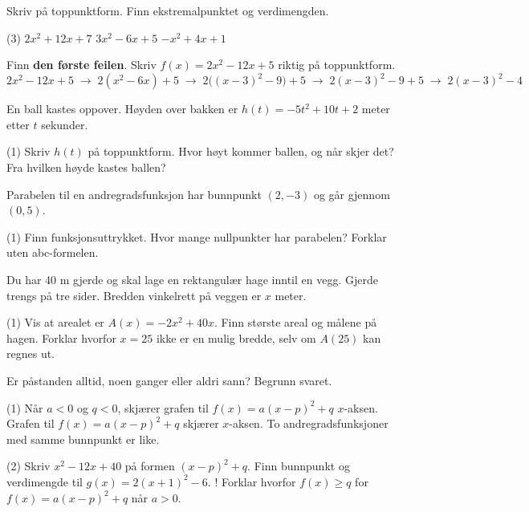 
Skriv på toppunktform. Finn ekstremalpunktet og verdimengden.
\begin{tasks}(3)
  \task $2x^2 + 12x + 7$
  \task $3x^2 - 6x + 5$
  \task $-x^2 + 4x + 1$
\end{tasks}

Finn \textbf{den første feilen}. Skriv $f(x) = 2x^2 - 12x + 5$ riktig på toppunktform.
\[ 2x^2 - 12x + 5 \;\longrightarrow\; 2(x^2 - 6x) + 5 \;\longrightarrow\; 2\big((x - 3)^2 - 9\big) + 5 \;\longrightarrow\; 2(x - 3)^2 - 9 + 5 \;\longrightarrow\; 2(x - 3)^2 - 4 \]

En ball kastes oppover. Høyden over bakken er $h(t) = -5t^2 + 10t + 2$ meter etter $t$ sekunder.
\begin{tasks}(1)
  \task Skriv $h(t)$ på toppunktform.
  \task Hvor høyt kommer ballen, og når skjer det?
  \task Fra hvilken høyde kastes ballen?
\end{tasks}


Parabelen til en andregradsfunksjon har bunnpunkt $(2, -3)$ og går gjennom $(0, 5)$.
\begin{tasks}(1)
  \task Finn funksjonsuttrykket.
  \task Hvor mange nullpunkter har parabelen? Forklar uten abc-formelen.
\end{tasks}

Du har 40 m gjerde og skal lage en rektangulær hage inntil en vegg. Gjerde trengs på tre sider. Bredden vinkelrett på veggen er $x$ meter.
\begin{center}
\end{center}
\begin{tasks}(1)
  \task Vis at arealet er $A(x) = -2x^2 + 40x$.
  \task Finn største areal og målene på hagen.
  \task Forklar hvorfor $x = 25$ ikke er en mulig bredde, selv om $A(25)$ kan regnes ut.
\end{tasks}

Er påstanden alltid, noen ganger eller aldri sann? Begrunn svaret.
\begin{tasks}(1)
  \task Når $a < 0$ og $q < 0$, skjærer grafen til $f(x) = a(x - p)^2 + q$ $x$-aksen.
  \task Grafen til $f(x) = a(x - p)^2 + q$ skjærer $x$-aksen.
  \task To andregradsfunksjoner med samme bunnpunkt er like.
\end{tasks}

\begin{sjekk}
\begin{tasks}(2)
  \task Skriv $x^2 - 12x + 40$ på formen $(x - p)^2 + q$.
  \task Finn bunnpunkt og verdimengde til $g(x) = 2(x + 1)^2 - 6$.
  \task! Forklar hvorfor $f(x) \ge q$ for $f(x) = a(x - p)^2 + q$ når $a > 0$.
\end{tasks}
\end{sjekk}
